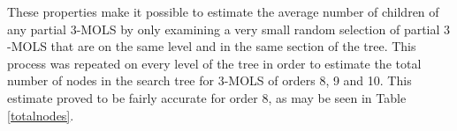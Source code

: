 \documentclass[11pt, a4paper]{article}
\newcounter{ls}
\begin{document}
These properties make it possible to estimate the average number of children of any partial $3$-MOLS by only examining a very small random selection of partial $3$-MOLS that are on the same level and in the same section of the tree. This process was repeated on every level  of the tree in order to estimate the total number 
of nodes in the search tree for $3$-MOLS of orders 8, 9 and 10.  This estimate  proved to be fairly accurate for order 8, as may be seen in Table \ref{totalnodes}.
 
\end{document}
